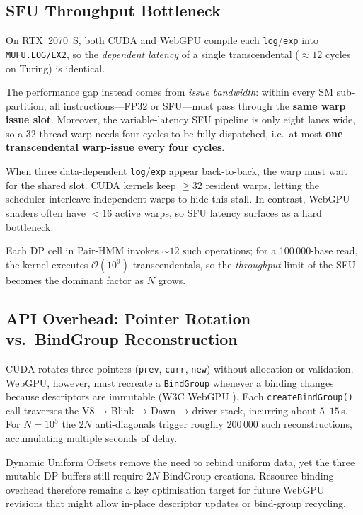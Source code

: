 \documentclass[PhD]{PHlab-thesis}
\begin{document}
\subsection{SFU Throughput Bottleneck}

On RTX~2070~S, both CUDA and WebGPU compile each
\texttt{log}/\texttt{exp} into \\ \texttt{MUFU.LOG/EX2}, so the
\emph{dependent latency} of a single transcendental
($\approx 12$ cycles on Turing) is identical.

The performance gap instead comes from \emph{issue bandwidth}:
within every SM sub-partition, all instructions—FP32 or SFU—must pass
through the \textbf{same warp issue slot}.
Moreover, the variable-latency SFU pipeline is only eight lanes wide,
so a 32-thread warp needs four cycles to be fully dispatched,
i.e.\ at most \textbf{one transcendental warp-issue every four cycles}.\cite{NVIDIA2023-cudaguide}

When three data-dependent \texttt{log}/\texttt{exp} appear back-to-back,
the warp must wait for the shared slot. CUDA kernels keep
$\geq 32$ resident warps, letting the scheduler interleave
independent warps to hide this stall.
In contrast, WebGPU shaders often have $<16$ active warps,
so SFU latency surfaces as a hard bottleneck.

Each DP cell in Pair-HMM invokes $\sim 12$ such operations;
for a 100\,000-base read, the kernel executes
$\mathcal{O}(10^{9})$ transcendentals, so the
\emph{throughput} limit of the SFU
becomes the dominant factor as $N$ grows.

\subsection{API Overhead: Pointer Rotation vs.\ BindGroup Reconstruction}
CUDA rotates three pointers (\texttt{prev}, \texttt{curr}, \texttt{new}) without allocation or validation\cite{NVIDIA2023-cudaguide}.  
WebGPU, however, must recreate a \texttt{BindGroup} whenever a binding changes because descriptors are immutable (W3C WebGPU \cite{W3C2024-webgpu}). Each \texttt{createBindGroup()} call traverses the V8 → Blink → Dawn → driver stack, incurring about $5$–$15$\,\textmu s. For $N=10^{5}$ the $2N$ anti-diagonals trigger roughly $200\,000$ such reconstructions, accumulating multiple seconds of delay.

Dynamic Uniform Offsets remove the need to rebind uniform data, yet the three mutable DP buffers still require $2N$ BindGroup creations. Resource-binding overhead therefore remains a key optimisation target for future WebGPU revisions that might allow in-place descriptor updates or bind-group recycling.
\end{document}
